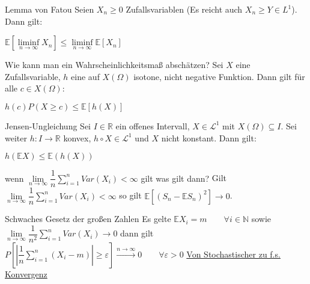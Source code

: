 \documentclass[avery5371,grid,frame]{flashcards} %
\newcommand{\1}{ \mathbb{1} } %
\begin{document}
\begin{flashcard}[Satz]{Lemma von Fatou}
  Seien $X_n\geq 0$ Zufallsvariablen (Es reicht auch $X_n \geq Y \in L^1$). Dann
  gilt:
  \begin{center}
    $\mathbb{E}[\liminf\limits_{n \to \infty} X_n]\leq
    \liminf\limits_{n \to \infty} \mathbb{E}[X_n]$
  \end{center}
\end{flashcard}

\begin{flashcard}[Satz]{Wie kann man ein Wahrscheinlichkeitsmaß abschätzen?}
  Sei $X$ eine Zufallsvariable, $h$ eine auf $X(\Omega)$ isotone, nicht negative
  Funktion. Dann gilt für alle $c \in X(\Omega)$:
  \begin{center}
    $h(c)P(X\geq c) \leq \mathbb{E}[h(X)]$
  \end{center}
\end{flashcard}

\begin{flashcard}[Satz]{Jensen-Ungleichung}
  Sei $I\in \mathbb{R}$ ein offenes Intervall, $X \in \mathcal{L}^1$
  mit $X(\Omega)\subseteq I$. Sei weiter $h:I\to\mathbb{R}$ konvex,
  $h\circ X \in \mathcal{L}^1$ und $X$ nicht konstant. Dann gilt:
  \begin{center}
    $h(\mathbb{E}X)\leq \mathbb{E}(h(X))$
  \end{center}
\end{flashcard}

\begin{flashcard}[Satz]{wenn $\lim\limits_{n \to \infty} \dfrac{1}{n}\sum\limits_{i=1}^nVar(X_i)<\infty$ gilt was gilt dann?}
  Gilt $\lim\limits_{n \to \infty} \dfrac{1}{n}\sum\limits_{i=1}^nVar(X_i)<\infty$ so gilt $\mathbb{E}[(S_n-\mathbb{E}S_n)^2]\to 0$.
\end{flashcard}

\begin{flashcard}[Satz]{Schwaches Gesetz der großen Zahlen}
  Es gelte
    $\mathbb{E}X_i=m\qquad \forall i \in \mathbb{N}$
  sowie
    $\lim\limits_{n \to \infty}
    \dfrac{1}{n^2}\sum\limits_{i=1}^nVar(X_i) \to 0$
  dann gilt
    $P\left[\left|\dfrac{1}{n}\sum\limits_{i=1}^n(X_i-m)\right|\geq
      \varepsilon\right] \overset{n \to \infty}{\to} 0 \qquad \forall
    \varepsilon >0$
  \underline{Von Stochastischer zu f.s. Konvergenz}
\end{flashcard}
\end{document}
